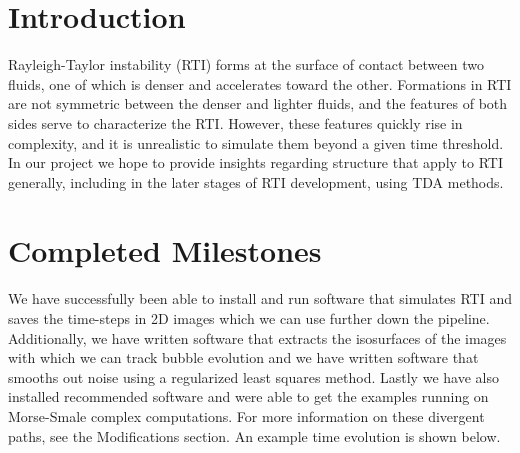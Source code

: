 \documentclass[12pt, fullpage,letterpaper]{article}
\begin{document}
	\section*{\normalfont Introduction}
	Rayleigh-Taylor instability (RTI) forms at the surface of contact between two fluids, one of which is denser and accelerates toward the other. Formations in RTI are not symmetric between the denser and lighter fluids, and the features of both sides serve to characterize the RTI. However, these features quickly rise in complexity, and it is unrealistic to simulate them beyond a given time threshold. In our project we hope to provide insights regarding structure that apply to RTI generally, including in the later stages of RTI development, using TDA methods.
	
	\section*{\normalfont Completed Milestones} We have successfully been able to install and run software that simulates RTI and saves the time-steps in 2D images which we can use further down the pipeline. Additionally, we have written software that extracts the isosurfaces of the images with which we can track bubble evolution and we have written software that smooths out noise using a regularized least squares method. Lastly we have also installed recommended software and were able to get the examples running on Morse-Smale complex computations. For more information on these divergent paths, see the Modifications section. An example time evolution is shown below.
%	
	
\end{document}

